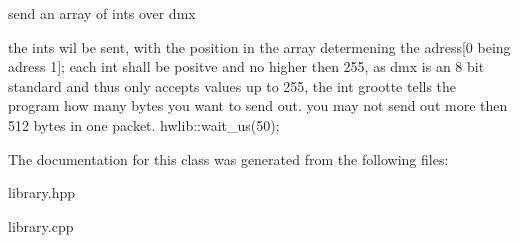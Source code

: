 send an array of ints over dmx 

the ints wil be sent, with the position in the array determening the adress\mbox{[}0 being adress 1\mbox{]}; each int shall be positve and no higher then 255, as dmx is an 8 bit standard and thus only accepts values up to 255, the int grootte tells the program how many bytes you want to send out. you may not send out more then 512 bytes in one packet. hwlib\+::wait\+\_\+us(50); 

The documentation for this class was generated from the following files\+:\begin{DoxyCompactItemize}
\item 
library.\+hpp\item 
library.\+cpp\end{DoxyCompactItemize}
